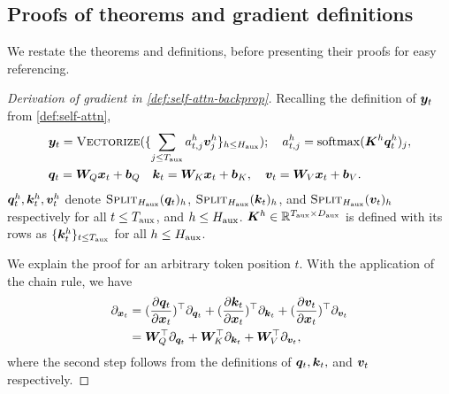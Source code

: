 \subsection{Proofs of theorems and gradient definitions}
We restate the theorems and definitions, before presenting their proofs for easy referencing.

\begin{proof}[Derivation of gradient in \cref{def:self-attn-backprop}]
    Recalling the definition of ${\bm{y}}_t$ from \cref{def:self-attn},
    \begin{align*}
        &{\bm{y}}_t = \textsc{Vectorize} ( \{ \sum_{j \le T_{\text{aux}}} a^h_{t, j}  {\bm{v}}^{h}_j  \}_{h \le H_{\text{aux}}} ); \quad
        a^h_{t, j} =  \mathrm{softmax} ( {\bm{K}}^{h} {\bm{q}}^{h}_t )_j, \\&
        {\bm{q}}_t = {\bm{W}}_Q {\bm{x}}_t + {\bm{b}}_Q  \quad {\bm{k}}_t =  {\bm{W}}_K {\bm{x}}_t + {\bm{b}}_K, \quad {\bm{v}}_t = {\bm{W}}_V {\bm{x}}_t + {\bm{b}}_V.
    \end{align*}
    ${\bm{q}}^{h}_t, {\bm{k}}^{h}_t, {\bm{v}}^{h}_t$ denote $\textsc{Split}_{H_{\text{aux}}} ({\bm{q}}_t)_h$, $\textsc{Split}_{H_{\text{aux}}} ({\bm{k}}_t)_h$, and $\textsc{Split}_{H_{\text{aux}}} ({\bm{v}}_t)_h$ respectively for all $t \le T_{\text{aux}}$, and $h \le H_{\text{aux}}$. 
     ${\bm{K}}^h \in \mathbb{R}^{T_{\text{aux}} \times D_{\text{aux}} }$ is defined with its rows as $\{{\bm{k}}^h_t\}_{t \le T_{\text{aux}}}$ for all $h \le H_{\text{aux}}$.
    

    We explain the proof for an arbitrary token position $t$.
    With the application of the chain rule, we have
    \begin{align*}
        \partial_{{\bm{x}}_t} &= ( \frac{ \partial {\bm{q}}_t }{ \partial {\bm{x}}_t } )^{\top}  \partial_{{\bm{q}}_t} +   ( \frac{ \partial {\bm{k}}_t }{ \partial {\bm{x}}_t } )^{\top}  \partial_{{\bm{k}}_t} +
        ( \frac{ \partial {\bm{v}}_t }{ \partial {\bm{x}}_t } )^{\top}  \partial_{{\bm{v}}_t} \\&
        = {\bm{W}}_Q^{\top} \partial_{{\bm{q}}_t} + {\bm{W}}_K^{\top} \partial_{{\bm{k}}_t} + {\bm{W}}_V^{\top} \partial_{{\bm{v}}_t},
    \end{align*}
    where the second step follows from the definitions of ${\bm{q}}_t, {\bm{k}}_t, $ and ${\bm{v}}_t$ respectively.


\end{proof}
